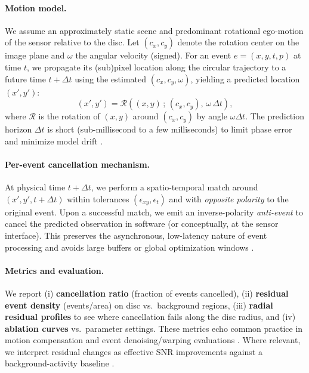 \paragraph{Motion model.}
We assume an approximately static scene and predominant rotational ego-motion of the sensor relative to the disc. Let $(c_x,c_y)$ denote the rotation center on the image plane and $\omega$ the angular velocity (signed). For an event $e=(x,y,t,p)$ at time $t$, we propagate its (sub)pixel location along the circular trajectory to a future time $t+\Delta t$ using the estimated $(c_x,c_y,\omega)$, yielding a predicted location $(x',y')$:
\[
(x',y') = \mathcal{R}\!\left((x,y)\,;\,(c_x,c_y),\,\omega\,\Delta t\right),
\]
where $\mathcal{R}$ is the rotation of $(x,y)$ around $(c_x,c_y)$ by angle $\omega \Delta t$. The prediction horizon $\Delta t$ is short (sub-millisecond to a few milliseconds) to limit phase error and minimize model drift \cite{Gallego2017Angular,Gallego2018CMax}.

\paragraph{Per-event cancellation mechanism.}
At physical time $t+\Delta t$, we perform a spatio-temporal match around $(x',y',t+\Delta t)$ within tolerances $(\epsilon_{xy},\epsilon_{t})$ and with \emph{opposite polarity} to the original event. Upon a successful match, we emit an inverse-polarity \emph{anti-event} to cancel the predicted observation in software (or conceptually, at the sensor interface). This preserves the asynchronous, low-latency nature of event processing and avoids large buffers or global optimization windows \cite{Bardow2016SOFIE,Gallego2018CMax}.

\paragraph{Metrics and evaluation.}
We report (i) \textbf{cancellation ratio} (fraction of events cancelled), (ii) \textbf{residual event density} (events/area) on disc vs.\ background regions, (iii) \textbf{radial residual profiles} to see where cancellation fails along the disc radius, and (iv) \textbf{ablation curves} vs.\ parameter settings. These metrics echo common practice in motion compensation and event denoising/warping evaluations \cite{Bardow2016SOFIE,Gallego2018CMax,Xu2020}. Where relevant, we interpret residual changes as effective SNR improvements against a background-activity baseline \cite{Gallego2020Survey}.

